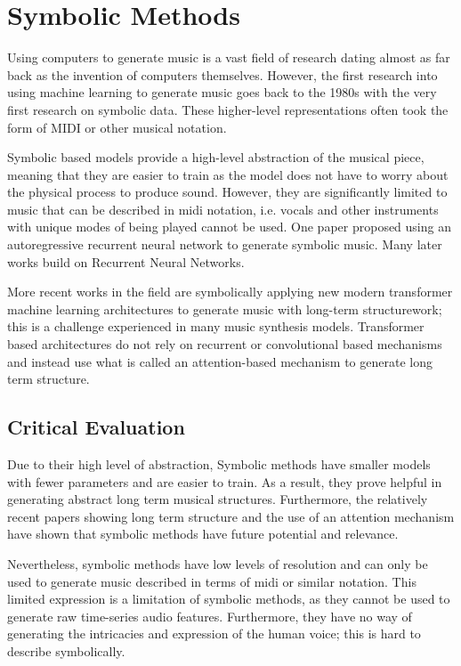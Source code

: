 \section{Symbolic Methods}

Using computers to generate music is a vast field of research dating almost as far back as the invention of computers themselves\cite{Hiller1958Musical}. However, the first research into using machine learning to generate music goes back to the 1980s\cite{ConnectionistComposition}\cite{GradientDescentLearning} with the very first research on symbolic data. These higher-level representations often took the form of MIDI or other musical notation.

Symbolic based models provide a high-level abstraction of the musical piece, meaning that they are easier to train as the model does not have to worry about the physical process to produce sound. However, they are significantly limited to music that can be described in midi notation, i.e. vocals and other instruments with unique modes of being played cannot be used. One paper proposed using an autoregressive recurrent neural network to generate symbolic music. Many later works build on Recurrent Neural Networks.

More recent works in the field are symbolically applying new modern transformer machine learning architectures to generate music with long-term structurework\cite{LongTermStructure}; this is a challenge experienced in many music synthesis models. Transformer based architectures do not rely on recurrent or convolutional based mechanisms and instead use what is called an attention-based mechanism to generate long term structure\cite{Attention}.

\subsection{Critical Evaluation}

Due to their high level of abstraction, Symbolic methods have smaller models with fewer parameters and are easier to train. As a result, they prove helpful in generating abstract long term musical structures. Furthermore, the relatively recent papers showing long term structure\cite{LongTermStructure} and the use of an attention mechanism\cite{Attention} have shown that symbolic methods have future potential and relevance.

Nevertheless, symbolic methods have low levels of resolution and can only be used to generate music described in terms of midi or similar notation. This limited expression is a limitation of symbolic methods, as they cannot be used to generate raw time-series audio features. Furthermore, they have no way of generating the intricacies and expression of the human voice; this is hard to describe symbolically. 


